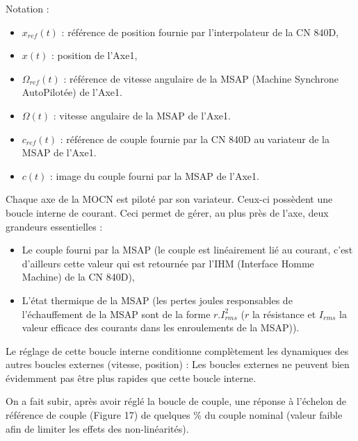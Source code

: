 Notation :
\begin{itemize}
 \item $x_{ref}(t)$ : référence de position fournie par l'interpolateur de la CN 840D,
 \item $x(t)$ : position de l'Axe1,
 \item $\Omega_{ref}(t)$ : référence de vitesse angulaire de la MSAP (Machine Synchrone AutoPilotée) de l'Axe1.
 \item $\Omega(t)$ : vitesse angulaire de la MSAP de l'Axe1.
 \item $c_{ref}(t)$ : référence de couple fournie par la CN 840D au variateur de la MSAP de l'Axe1.
 \item $c(t)$ : image du couple fourni par la MSAP de l'Axe1.
\end{itemize}

Chaque axe de la MOCN est piloté par son variateur. Ceux-ci possèdent une boucle interne de courant. Ceci permet de gérer, au plus près de l'axe, deux grandeurs essentielles :
\begin{itemize}
 \item Le couple fourni par la MSAP (le couple est linéairement lié au courant, c'est d'ailleurs cette valeur qui est retournée par l'IHM (Interface Homme Machine) de la CN 840D),
 \item L'état thermique de la MSAP (les pertes joules responsables de l'échauffement de la MSAP sont de la forme $r.I_{rms}^2$ ($r$ la résistance et $I_{rms}$ la valeur efficace des courants dans les enroulements de la MSAP)).
\end{itemize}

Le réglage de cette boucle interne conditionne complètement les dynamiques des autres boucles externes (vitesse, position) : Les boucles externes ne peuvent bien évidemment pas être plus rapides que cette boucle interne.




On a fait subir, après avoir réglé la boucle de couple, une réponse à l'échelon de référence de couple (Figure 17) de quelques \% du couple nominal (valeur faible afin de limiter les effets des non-linéarités).


